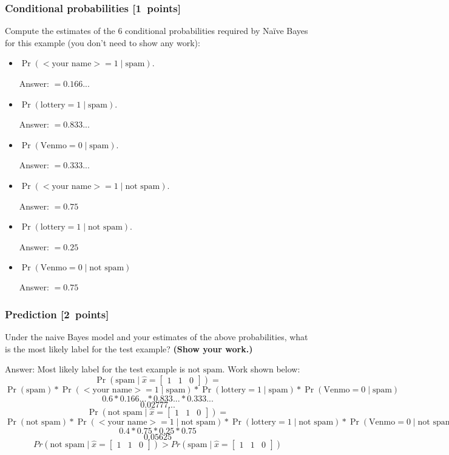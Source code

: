 \documentclass{article}
\newcommand{\blu}[1]{{\textcolor{blu}{#1}}}
\newcommand{\gre}[1]{\textcolor{gre}{#1}}
\newcommand\ans[1]{\par\gre{Answer: #1}}
\let\ask\blu
\newcommand\pts[1]{\textcolor{pointscolour}{[#1~points]}}
\begin{document}
    \subsubsection{Conditional probabilities \pts{1}}

    \ask{Compute the estimates of the 6 conditional probabilities required by Na\"ive Bayes for this example}  (you don't need to show any work):
    \begin{itemize}
        \item $\Pr(\text{$<$your name$>$} = 1  \mid \text{spam})$.
        \ans{$= 0.166...$}
        \item $\Pr(\text{lottery} = 1 \mid \text{spam})$.
        \ans{$= 0.833...$}
        \item $\Pr(\text{Venmo} = 0  \mid \text{spam})$.
        \ans{$= 0.333...$}
        \item $\Pr(\text{$<$your name$>$} = 1  \mid \text{not spam})$.
        \ans{$= 0.75$}
        \item $\Pr(\text{lottery} = 1  \mid \text{not spam})$.
        \ans{$= 0.25$}
        \item $\Pr(\text{Venmo} = 0  \mid \text{not spam})$
        \ans{$= 0.75$}
    \end{itemize}

    \subsubsection{Prediction \pts{2}}

    \ask{Under the naive Bayes model and your estimates of the above probabilities, what is the most likely label for the test example? \textbf{(Show your work.)}}
    
    \ans{Most likely label for the test example is $\text{not spam}$. Work shown below:}
    \
    \[
    \Pr(\text{spam} \mid \hat{x} = \begin{bmatrix}1 & 1 & 0\end{bmatrix})=
    \]
    \[
    \Pr(\text{spam})*\Pr(\text{$<$your name$>$} = 1  \mid \text{spam})*\Pr(\text{lottery} = 1 \mid \text{spam})*\Pr(\text{Venmo} = 0  \mid \text{spam})
    \]
    \[
    0.6 * 0.166... * 0.833... * 0.333...
    \]
    \[
    0.02777...
    \]
    \newline
    \[
    \Pr(\text{not spam} \mid \hat{x} = \begin{bmatrix}1 & 1 & 0\end{bmatrix})=
    \]
    \[
    \Pr(\text{not spam})*\Pr(\text{$<$your name$>$} = 1  \mid \text{not spam})*\Pr(\text{lottery} = 1 \mid \text{not spam})*\Pr(\text{Venmo} = 0  \mid \text{not spam})
    \]
    \[
    0.4 * 0.75 * 0.25 * 0.75
    \]
    \[
    0.05625
    \]
    \newline
    \[
    Pr(\text{not spam} \mid \hat{x} = \begin{bmatrix}1 & 1 & 0\end{bmatrix}) > Pr(\text{spam} \mid \hat{x} = \begin{bmatrix}1 & 1 & 0\end{bmatrix})
    \]
    \newpage
\end{document}
